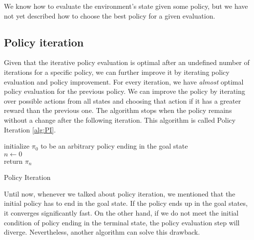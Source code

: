 We know how to evaluate the environment's state given some policy, but we have not yet described how to choose the best policy for a given evaluation. 

\subsection{Policy iteration}
Given that the iterative policy evaluation is optimal after an undefined number of iterations for a specific policy, we can further improve it by iterating policy evaluation and policy improvement.
For every iteration, we have \textit{almost} optimal policy evaluation for the previous policy. We can improve the policy by iterating over possible actions from all states and choosing that action if it has a greater reward than the previous one. The algorithm stops when the policy remains without a change after the following iteration. This algorithm is called Policy Iteration \ref{alg:PI}.

\LinesNumbered
\begin{algorithm}[ht]
\SetAlgoLined
initialize $\pi_0$ to be an arbitrary policy ending in the goal state\\
$n \xleftarrow{} 0$ \\
return $\pi_n$
\caption{Policy Iteration}
\label{alg:PI}
\end{algorithm}

Until now, whenever we talked about policy iteration, we mentioned that the initial policy has to end in the goal state. If the policy ends up in the goal states, it converges significantly fast. On the other hand, if we do not meet the initial condition of policy ending in the terminal state, the policy evaluation step will diverge. Nevertheless, another algorithm can solve this drawback.


